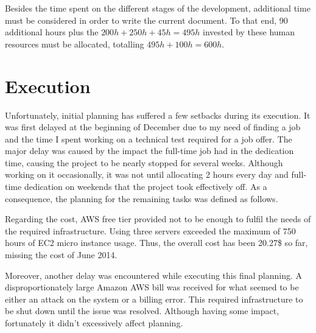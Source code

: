 Besides the time spent on the different stages of the development, additional time must be considered in order to write the current document. To that end, 90 additional hours plus the $200h + 250h + 45h = 495h$ invested by these human resources must be allocated, totalling $495h + 100h = 600h$.

\section{Execution}

Unfortunately, initial planning has suffered a few setbacks during its execution. It was first delayed at the beginning of December due to my need of finding a job and the time I spent working on a technical test required for a job offer. The major delay was caused by the impact the full-time job had in the dedication time, causing the project to be nearly stopped for several weeks. Although working on it occasionally, it was not until allocating 2 hours every day and full-time dedication on weekends that the project took effectively off. As a consequence, the planning for the remaining tasks was defined as follows.

Regarding the cost, AWS free tier provided not to be enough to fulfil the needs of the required infrastructure. Using three servers exceeded the maximum of 750 hours of EC2 micro instance usage. Thus, the overall cost has been 20.27\$ so far, missing the cost of June 2014.

Moreover, another delay was encountered while executing this final planning. A disproportionately large Amazon AWS bill was received for what seemed to be either an attack on the system or a billing error. This required infrastructure to be shut down until the issue was resolved. Although having some impact, fortunately it didn't excessively affect planning.

